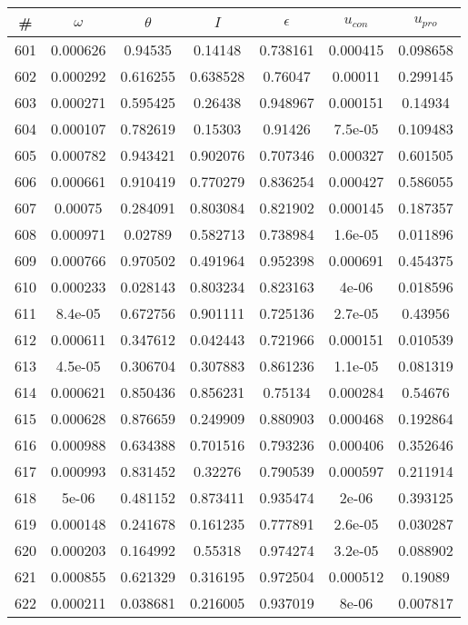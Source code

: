 \newpage
\begin{table}
\begin{tabular}{c|c|c|c|c|c|c}
\# & $\omega$ & $\theta$ & $I$ & $\epsilon$ & $u_{con}$ & $u_{pro}$\\
\hline
601 & 0.000626 & 0.94535 & 0.14148 & 0.738161 & 0.000415 & 0.098658\\
602 & 0.000292 & 0.616255 & 0.638528 & 0.76047 & 0.00011 & 0.299145\\
603 & 0.000271 & 0.595425 & 0.26438 & 0.948967 & 0.000151 & 0.14934\\
604 & 0.000107 & 0.782619 & 0.15303 & 0.91426 & 7.5e-05 & 0.109483\\
605 & 0.000782 & 0.943421 & 0.902076 & 0.707346 & 0.000327 & 0.601505\\
606 & 0.000661 & 0.910419 & 0.770279 & 0.836254 & 0.000427 & 0.586055\\
607 & 0.00075 & 0.284091 & 0.803084 & 0.821902 & 0.000145 & 0.187357\\
608 & 0.000971 & 0.02789 & 0.582713 & 0.738984 & 1.6e-05 & 0.011896\\
609 & 0.000766 & 0.970502 & 0.491964 & 0.952398 & 0.000691 & 0.454375\\
610 & 0.000233 & 0.028143 & 0.803234 & 0.823163 & 4e-06 & 0.018596\\
611 & 8.4e-05 & 0.672756 & 0.901111 & 0.725136 & 2.7e-05 & 0.43956\\
612 & 0.000611 & 0.347612 & 0.042443 & 0.721966 & 0.000151 & 0.010539\\
613 & 4.5e-05 & 0.306704 & 0.307883 & 0.861236 & 1.1e-05 & 0.081319\\
614 & 0.000621 & 0.850436 & 0.856231 & 0.75134 & 0.000284 & 0.54676\\
615 & 0.000628 & 0.876659 & 0.249909 & 0.880903 & 0.000468 & 0.192864\\
616 & 0.000988 & 0.634388 & 0.701516 & 0.793236 & 0.000406 & 0.352646\\
617 & 0.000993 & 0.831452 & 0.32276 & 0.790539 & 0.000597 & 0.211914\\
618 & 5e-06 & 0.481152 & 0.873411 & 0.935474 & 2e-06 & 0.393125\\
619 & 0.000148 & 0.241678 & 0.161235 & 0.777891 & 2.6e-05 & 0.030287\\
620 & 0.000203 & 0.164992 & 0.55318 & 0.974274 & 3.2e-05 & 0.088902\\
621 & 0.000855 & 0.621329 & 0.316195 & 0.972504 & 0.000512 & 0.19089\\
622 & 0.000211 & 0.038681 & 0.216005 & 0.937019 & 8e-06 & 0.007817\\

\end{tabular}
\end{table}

